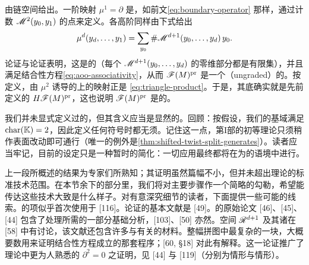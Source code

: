 由\trFloer{}链空间给出。一阶映射 $\mu^1=\partial$ 是\trBoundaryOperator，如前文\eqref{eq:boundary-operator} 那样，通过计数 $\mathscr{M}^2(y_0,y_1)$ 的\trIsolated{}点来定义。各高阶\trComposition{}同样由下式给出
\begin{equation}\label{eq:higher-compositions}
\mu^d(y_d,\ldots,y_1)=\sum_{y_0}\#\mathscr{M}^{d+1}(y_0,\ldots,y_d)\,y_0.
\end{equation}
\trCompactness{}论证与\trGluing{}论证表明，这是\trWellDefined{}的（每个 $\mathscr{M}^{d+1}(y_0,\ldots,y_d)$ 的零维部分都是有限集），并且满足\trAinfty{}结合性方程\eqref{eq:aoo-associativity}，从而 $\mathscr{F}(M)^{\mathrm{pr}}$ 是一个\textbf{\trUngraded}（ungraded）的\trACategory。按定义，由 $\mu^2$ 诱导的\trCohomology{}上的映射正是\trTriangleProduct{} \eqref{eq:triangle-product}。于是，其底\trCohomology{}\trCategory{}确实就是先前定义的 $H\mathscr{F}(M)^{\mathrm{pr}}$，这也说明 $\mathscr{F}(M)^{\mathrm{pr}}$ 是\trCunital{}的。
\begin{remark}\label{thm:ungraded-category-remark}
我们并未显式定义过\trUngraded{}的\trACategory，但其含义应当是显然的。回顾：按假设，我们的基域满足 $\mathrm{char}(\mathbb{K})=2$，因此定义任何符号时都无须\trGrading。记住这一点，第I部的初等理论只须稍作表面改动即可通行（唯一的例外是\cref{thm:shifted-twist-split-generates}）。读者应当牢记，目前的设定只是一种暂时的简化：一切应用最终都将在\trGrading{}为\trWellDefined{}的语境中进行。
\end{remark}
\begin{remark}\label{thm:proof-references-remark}
上一段所概述的结果为专家们所熟知；其证明虽然篇幅不小，但并未超出\trPseudoholomorphicCurve{}理论的标准技术范围。在本节余下的部分里，我们将对主要步骤作一个简略的勾勒，希望能传达这些技术大致是什么样子。对有意深究细节的读者，下面提供一些可能的线索。\trRiemann\trSurface\trFamily{}的\trInhomogeneous{}项似乎首次使用于 [116]。\trTransversality{}论证的基本文献是 [49]。\trFloer{}的原始论文 [46]、[45]、[44] 包含了处理\trLagrange\trBoundaryCondition{}所需的一部分基础分析，[103]、[50] 亦然。空间 $\mathscr{R}^{d+1}$ 及其诸\trCompactification{}在 [58] 中有讨论，该文献还包含许多与\trFukayaCategory{}有关的材料。整幅拼图中最复杂的一块，大概要数用来证明\trAinfty{}结合性方程成立的那套\trGluing{}程序；[60, \S18] 对此有解释。这一论证推广了\trFloer{}理论中更为人熟悉的 $\partial^2=0$ 之证明，见 [44] 与 [119]（分别为\trLagrange{}情形与\trHamiltonian{}情形）。
\end{remark}
